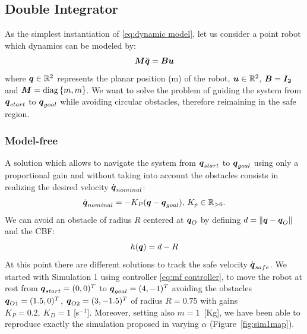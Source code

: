 \subsection{Double Integrator}
As the simplest instantiation of \eqref{eq:dynamic model}, let us consider a point robot which dynamics can be modeled by: 
\begin{equation}
    \boldsymbol{M}\ddot{{\boldsymbol{q}}} = \boldsymbol{B}\boldsymbol{u}
\end{equation}
where ${\boldsymbol{q}} \in \mathbb{R}^2$ represents the planar position (m) of the robot, $\boldsymbol{u} \in \mathbb{R}^2$, $\boldsymbol{B}=\boldsymbol{I_2}$ and $\boldsymbol{M} = \mbox{diag}\left\{m, m\right\}$.
We want to solve the problem of guiding the system from ${\boldsymbol{q}}_{start}$ to ${\boldsymbol{q}}_{goal}$ while avoiding circular obstacles, therefore reimaining in the safe region.
\subsubsection{Model-free}
A solution which allows to navigate the system from ${\boldsymbol{q}}_{start}$ to ${\boldsymbol{q}}_{goal}$ using only a proportional gain and without taking into account the obstacles consists in realizing the desired velocity $\dot{{\boldsymbol{q}}}_{nominal}$:   
\begin{equation}
    \dot{{\boldsymbol{q}}}_{nominal}=-K_P({\boldsymbol{q}} - {\boldsymbol{q}}_{goal}),\,K_p\in\mathbb{R}_{>0}.
\end{equation}
 We can avoid an obstacle of radius $R$ centered at ${\boldsymbol{q}}_O$ by defining $d = \lVert {\boldsymbol{q}}-{\boldsymbol{q}}_O \rVert$ and the CBF:
\begin{equation}
h({\boldsymbol{q}})=d-R
\end{equation}
At this point there are different solutions to track the safe velocity $\dot{{\boldsymbol{q}}}_{safe}$. We started with Simulation 1 using controller \eqref{eq:mf controller}, to move the robot at rest from ${\boldsymbol{q}}_{start}=(0,0)^T$ to ${\boldsymbol{q}}_{goal}=(4,-1)^T$ avoiding the obstacles ${\boldsymbol{q}}_{O1}=(1.5,0)^T$, ${\boldsymbol{q}}_{O2}=(3,-1.5)^T$ of radius $R=0.75$ with gains $K_P = 0.2,~K_D=1$ [s$^{-1}$]. Moreover, setting also $m=1$~[Kg], we have been able to reproduce exactly the simulation proposed in \cite{mfcbf} varying $\alpha$ (Figure~\ref{fig:sim1map}).

